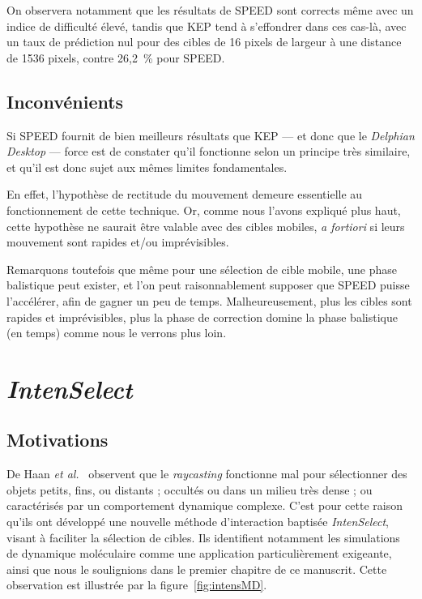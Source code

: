 	On observera notamment que les résultats de SPEED sont corrects même avec un indice de difficulté élevé, tandis que KEP tend à s'effondrer dans ces cas-là, avec un taux de prédiction nul pour des cibles de 16 pixels de largeur à une distance de 1536 pixels, contre 26,2~\%{} pour SPEED.
			
	\subsection{Inconvénients}
	Si SPEED fournit de bien meilleurs résultats que KEP --- et donc que le \emph{Delphian Desktop} --- force est de constater qu'il fonctionne selon un principe très similaire, et qu'il est donc sujet aux mêmes limites fondamentales.
	
	En effet, l'hypothèse de rectitude du mouvement demeure essentielle au fonctionnement de cette technique. Or, comme nous l'avons expliqué plus haut, cette hypothèse ne saurait être valable avec des cibles mobiles, \emph{a fortiori} si leurs mouvement sont rapides et/ou imprévisibles.
	
	Remarquons toutefois que même pour une sélection de cible mobile, une phase balistique peut exister, et l'on peut raisonnablement supposer que SPEED puisse l'accélérer, afin de gagner un peu de temps. Malheureusement, plus les cibles sont rapides et imprévisibles, plus la phase de correction domine la phase balistique (en temps) comme nous le verrons plus loin.


\section{\emph{IntenSelect}}
	\subsection{Motivations}
	De Haan \emph{et al.}~\cite{de2005intenselect} observent que le \emph{raycasting} fonctionne mal pour sélectionner des objets petits, fins, ou distants ; occultés ou dans un milieu très dense ; ou caractérisés par un comportement dynamique complexe. C'est pour cette raison qu'ils ont développé une nouvelle méthode d'interaction baptisée \emph{IntenSelect}, visant à faciliter la sélection de cibles. Ils identifient notamment les simulations de dynamique moléculaire comme une application particulièrement exigeante, ainsi que nous le soulignions dans le premier chapitre de ce manuscrit. Cette observation est illustrée par la figure~\ref{fig:intensMD}.
	
